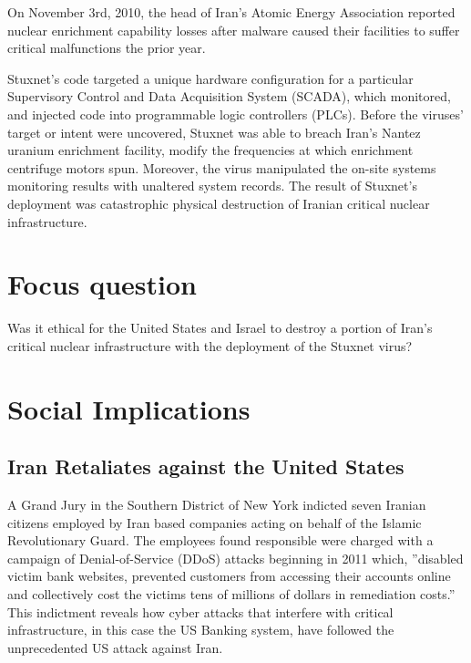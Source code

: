 \documentclass[12pt]{article}
\begin{document}
\begin{multicols}{2}
On November 3rd, 2010, the head of Iran's Atomic Energy Association reported nuclear enrichment capability losses after malware caused their facilities to suffer critical malfunctions the prior year.\cite{didStuxnetTakeOut1000Centrifuges} 

Stuxnet's code targeted a unique hardware configuration for a particular Supervisory Control and Data Acquisition System (SCADA), which monitored, and injected code into programmable logic controllers (PLCs). Before the viruses' target or intent were uncovered, Stuxnet was able to breach Iran's Nantez uranium enrichment facility, modify the frequencies at which enrichment centrifuge motors spun. Moreover, the virus manipulated the on-site systems monitoring results with unaltered system records. The result of Stuxnet's deployment was catastrophic physical destruction of Iranian critical nuclear infrastructure.\cite{w32.stuxnetDossier}\cite{lessonsFromStuxnet}

\section{Focus question}

Was it ethical for the United States and Israel to destroy a portion of Iran's critical nuclear infrastructure with the deployment of the Stuxnet virus?

\section{Social Implications}

\subsection{Iran Retaliates against the United States}
A Grand Jury in the Southern District of New York indicted seven Iranian citizens employed by Iran based companies acting on behalf of the Islamic Revolutionary Guard. The employees found responsible were charged with a campaign of Denial-of-Service (DDoS) attacks beginning in 2011 which, ”disabled victim bank websites, prevented customers from accessing their accounts online and collectively cost the victims tens of millions of dollars in remediation costs.”\cite{sevenIraniansIndicted} This indictment reveals how cyber attacks that interfere with critical infrastructure, in this case the US Banking system, have followed the unprecedented US attack against Iran.


\end{multicols}
\end{document}
